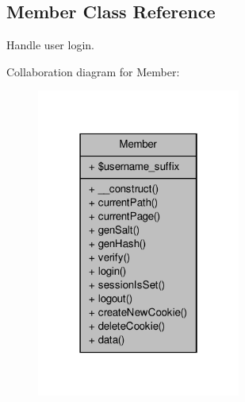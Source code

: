 \hypertarget{classMember}{\subsection{Member Class Reference}
\label{classMember}
}


Handle user login.  




Collaboration diagram for Member\-:\nopagebreak
\begin{figure}[H]
\begin{center}
\leavevmode
\includegraphics[width=190pt]{classMember__coll__graph}
\end{center}
\end{figure}
